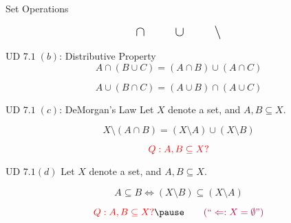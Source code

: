 \begin{frame}{}
  \centerline{\Large Set Operations}

  \[
    \text{\Large $\cap \qquad \cup \qquad \setminus$}
  \]
\end{frame}

\begin{frame}{}
  \begin{exampleblock}{UD $7.1 \;(b)$: Distributive Property}
    \[
      A \cap (B \cup C) = (A \cap B) \cup (A \cap C)
    \]
  \end{exampleblock}

  \pause
  \vspace{0.50cm}
  \begin{theorem}
    \[
      A \cup (B \cap C) = (A \cup B) \cap (A \cup C)
    \]

  \end{theorem}
\end{frame}

\begin{frame}{}
  \begin{exampleblock}{UD $7.1 \;(c)$: DeMorgan's Law}
    Let $X$ denote a set, and $A, B \subseteq X$.

    \[
      X \setminus (A \cap B) = (X \setminus A) \cup (X \setminus B)
    \]
  \end{exampleblock}

  \pause
  \vspace{0.50cm}
  \[
    \textcolor{red}{Q: A, B \subseteq X?}
  \]
\end{frame}

\begin{frame}{}
  \begin{exampleblock}{UD $7.1 (d)$}
    Let $X$ denote a set, and $A, B \subseteq X$.

    \[
      A \subseteq B \iff (X \setminus B) \subseteq (X \setminus A)
    \]
  \end{exampleblock}

  \pause
  \vspace{0.50cm}

  \pause
  \centerline{}

  \pause
  \[
    \red{Q: A, B \subseteq X?} \pause \qquad \textcolor{purple}{(``\Leftarrow: X = \emptyset")}
  \]
\end{frame}

